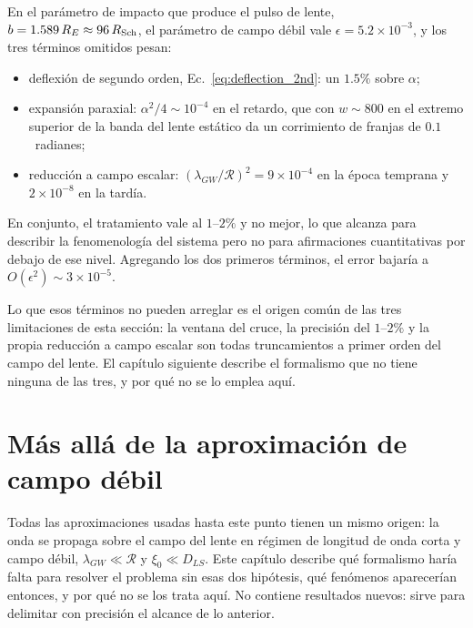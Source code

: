 \documentclass[11pt,a4paper,openany]{book}
\begin{document}
\begin{ejemplo}[title={El presupuesto de error del triple concreto}]
En el par\'ametro de impacto que produce el pulso de lente,
$b=1.589\,R_E\approx96\,R_{\rm Sch}$, el par\'ametro de campo d\'ebil vale
$\epsilon=5.2\times10^{-3}$, y los tres t\'erminos omitidos pesan:
\begin{itemize}\itemsep2pt
  \item deflexi\'on de segundo orden, Ec.~\eqref{eq:deflection_2nd}: un
    $1.5\%$ sobre $\alpha$;
  \item expansi\'on paraxial: $\alpha^{2}/4\sim10^{-4}$ en el retardo, que con
    $w\sim800$ en el extremo superior de la banda del lente est\'atico da un
    corrimiento de franjas de $0.1$~radianes;
  \item reducci\'on a campo escalar:
    $(\lambda_{GW}/\mathcal{R})^{2}=9\times10^{-4}$ en la \'epoca temprana y
    $2\times10^{-8}$ en la tard\'ia.
\end{itemize}
En conjunto, el tratamiento vale al $1$--$2\%$ y no mejor, lo que alcanza para
describir la fenomenolog\'ia del sistema pero no para afirmaciones
cuantitativas por debajo de ese nivel. Agregando los dos primeros t\'erminos,
el error bajar\'ia a $O(\epsilon^{2})\sim3\times10^{-5}$.
\end{ejemplo}

Lo que esos t\'erminos no pueden arreglar es el origen com\'un de las tres
limitaciones de esta secci\'on: la ventana del cruce, la precisi\'on del
$1$--$2\%$ y la propia reducci\'on a campo escalar son todas truncamientos a
primer orden del campo del lente. El cap\'itulo siguiente describe el
formalismo que no tiene ninguna de las tres, y por qu\'e no se lo emplea
aqu\'i.

\chapter{M\'as all\'a de la aproximaci\'on de campo d\'ebil}
\label{ch:beyond}

Todas las aproximaciones usadas hasta este punto tienen un mismo origen: la
onda se propaga sobre el campo del lente en r\'egimen de longitud de onda
corta y campo d\'ebil, $\lambda_{GW}\ll\mathcal{R}$ y $\xi_0\ll D_{LS}$. Este
cap\'itulo describe qu\'e formalismo har\'ia falta para resolver el problema
sin esas dos hip\'otesis, qu\'e fen\'omenos aparecer\'ian entonces, y por
qu\'e no se los trata aqu\'i. No contiene resultados nuevos: sirve para
delimitar con precisi\'on el alcance de lo anterior.
\end{document}
